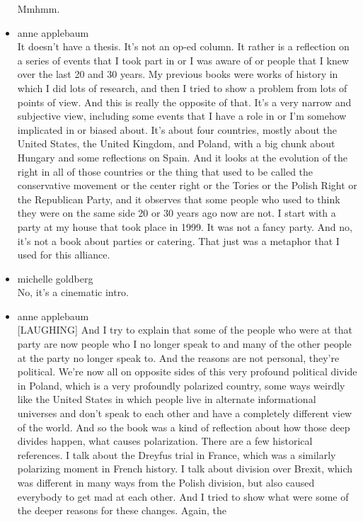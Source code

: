 \begin{itemize}
  Mmhmm.
\item
  anne applebaum\\
  It doesn't have a thesis. It's not an op-ed column. It rather is a
  reflection on a series of events that I took part in or I was aware of
  or people that I knew over the last 20 and 30 years. My previous books
  were works of history in which I did lots of research, and then I
  tried to show a problem from lots of points of view. And this is
  really the opposite of that. It's a very narrow and subjective view,
  including some events that I have a role in or I'm somehow implicated
  in or biased about. It's about four countries, mostly about the United
  States, the United Kingdom, and Poland, with a big chunk about Hungary
  and some reflections on Spain. And it looks at the evolution of the
  right in all of those countries or the thing that used to be called
  the conservative movement or the center right or the Tories or the
  Polish Right or the Republican Party, and it observes that some people
  who used to think they were on the same side 20 or 30 years ago now
  are not. I start with a party at my house that took place in 1999. It
  was not a fancy party. And no, it's not a book about parties or
  catering. That just was a metaphor that I used for this alliance.
\item
  michelle goldberg\\
  No, it's a cinematic intro.
\item
  anne applebaum\\
  {[}LAUGHING{]} And I try to explain that some of the people who were
  at that party are now people who I no longer speak to and many of the
  other people at the party no longer speak to. And the reasons are not
  personal, they're political. We're now all on opposite sides of this
  very profound political divide in Poland, which is a very profoundly
  polarized country, some ways weirdly like the United States in which
  people live in alternate informational universes and don't speak to
  each other and have a completely different view of the world. And so
  the book was a kind of reflection about how those deep divides happen,
  what causes polarization. There are a few historical references. I
  talk about the Dreyfus trial in France, which was a similarly
  polarizing moment in French history. I talk about division over
  Brexit, which was different in many ways from the Polish division, but
  also caused everybody to get mad at each other. And I tried to show
  what were some of the deeper reasons for these changes. Again, the

\end{itemize}
